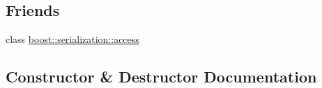 \subsection*{Friends}
\begin{DoxyCompactItemize}
\item 
class \hyperlink{classIceBRG_1_1pair__bin__summary_ac98d07dd8f7b70e16ccb9a01abf56b9c}{boost\+::serialization\+::access}
\end{DoxyCompactItemize}


\subsection{Constructor \& Destructor Documentation}
\hypertarget{classIceBRG_1_1pair__bin__summary_a25c4a1af9dd06f9194799604d5d6ea06}{}
